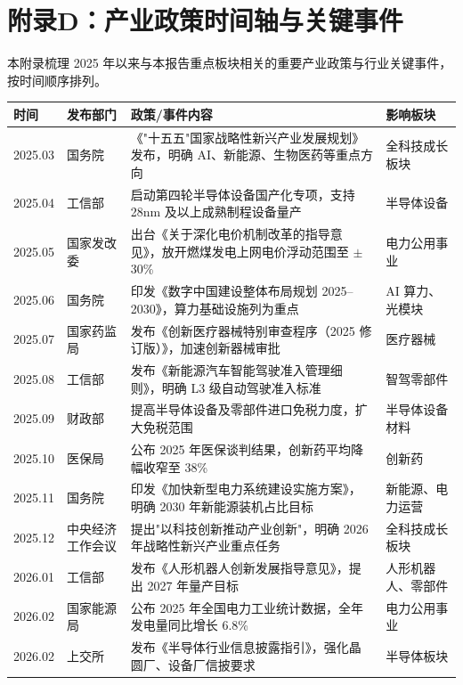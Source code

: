 \section{附录D：产业政策时间轴与关键事件}

本附录梳理 2025 年以来与本报告重点板块相关的重要产业政策与行业关键事件，按时间顺序排列。

\begin{exhibitbox}[表 D-1：重点产业政策与关键事件时间轴]
\centering
\scriptsize
\renewcommand{\arraystretch}{1.2}
\begin{tabularx}{\textwidth}{@{}l l X l@{}}
\toprule
\textbf{时间} & \textbf{发布部门} & \textbf{政策/事件内容} & \textbf{影响板块} \\
\midrule
2025.03 & 国务院 & 《"十五五"国家战略性新兴产业发展规划》发布，明确 AI、新能源、生物医药等重点方向 & 全科技成长板块 \\
2025.04 & 工信部 & 启动第四轮半导体设备国产化专项，支持 28nm 及以上成熟制程设备量产 & 半导体设备 \\
2025.05 & 国家发改委 & 出台《关于深化电价机制改革的指导意见》，放开燃煤发电上网电价浮动范围至 $\pm$30\% & 电力公用事业 \\
2025.06 & 国务院 & 印发《数字中国建设整体布局规划 2025--2030》，算力基础设施列为重点 & AI 算力、光模块 \\
2025.07 & 国家药监局 & 发布《创新医疗器械特别审查程序（2025 修订版）》，加速创新器械审批 & 医疗器械 \\
2025.08 & 工信部 & 发布《新能源汽车智能驾驶准入管理细则》，明确 L3 级自动驾驶准入标准 & 智驾零部件 \\
2025.09 & 财政部 & 提高半导体设备及零部件进口免税力度，扩大免税范围 & 半导体设备材料 \\
2025.10 & 医保局 & 公布 2025 年医保谈判结果，创新药平均降幅收窄至 38\% & 创新药 \\
2025.11 & 国务院 & 印发《加快新型电力系统建设实施方案》，明确 2030 年新能源装机占比目标 & 新能源、电力运营 \\
2025.12 & 中央经济工作会议 & 提出"以科技创新推动产业创新"，明确 2026 年战略性新兴产业重点任务 & 全科技成长板块 \\
\midrule
2026.01 & 工信部 & 发布《人形机器人创新发展指导意见》，提出 2027 年量产目标 & 人形机器人、零部件 \\
2026.02 & 国家能源局 & 公布 2025 年全国电力工业统计数据，全年发电量同比增长 6.8\% & 电力公用事业 \\
2026.02 & 上交所 & 发布《半导体行业信息披露指引》，强化晶圆厂、设备厂信披要求 & 半导体板块 \\

\end{tabularx}
\end{exhibitbox}
